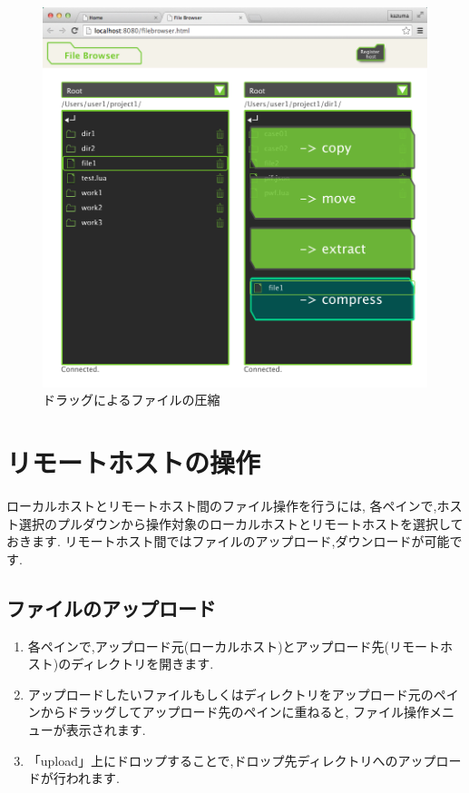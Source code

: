 \documentclass[a4paper,10pt,oneside]{jsbook}
\begin{document}
\begin{figure}[htbp]
	\begin{center}
		\includegraphics[width=12.0cm]{image/filebrowser_006.png}
	\end{center}
	\caption{ドラッグによるファイルの圧縮}
	\label{fig:filebrowser_filecompress}
\end{figure}

\newpage

\section{リモートホストの操作}
ローカルホストとリモートホスト間のファイル操作を行うには,
各ペインで,ホスト選択のプルダウンから操作対象のローカルホストとリモートホストを選択しておきます.
リモートホスト間ではファイルのアップロード,ダウンロードが可能です.
\subsection{ファイルのアップロード}
\begin{enumerate}
	\item 各ペインで,アップロード元(ローカルホスト)とアップロード先(リモートホスト)のディレクトリを開きます.
	\item アップロードしたいファイルもしくはディレクトリをアップロード元のペインからドラッグしてアップロード先のペインに重ねると,
		  ファイル操作メニューが表示されます.
	\item 「upload」上にドロップすることで,ドロップ先ディレクトリへのアップロードが行われます.
\end{enumerate}
\end{document}
